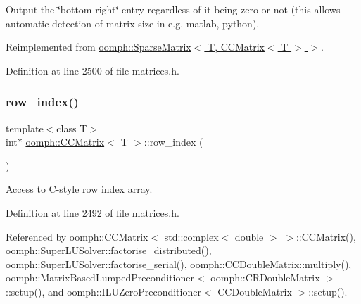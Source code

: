 Output the \char`\"{}bottom right\char`\"{} entry regardless of it being zero or not (this allows automatic detection of matrix size in e.\+g. matlab, python). 



Reimplemented from \hyperlink{classoomph_1_1SparseMatrix_a4c638f36db786e159565e1f890402ed2}{oomph\+::\+Sparse\+Matrix$<$ T, C\+C\+Matrix$<$ T $>$ $>$}.



Definition at line 2500 of file matrices.\+h.

\mbox{\label{classoomph_1_1CCMatrix_acbea54ff48550342267246b7ae07c8c4}} 
\subsubsection{\texorpdfstring{row\+\_\+index()}{row\_index()}\hspace{0.1cm}{\footnotesize\ttfamily [1/2]}}
{\footnotesize\ttfamily template$<$class T$>$ \\
int$\ast$ \hyperlink{classoomph_1_1CCMatrix}{oomph\+::\+C\+C\+Matrix}$<$ T $>$\+::row\+\_\+index (\begin{DoxyParamCaption}{ }\end{DoxyParamCaption})\hspace{0.3cm}{\ttfamily [inline]}}



Access to C-\/style row index array. 



Definition at line 2492 of file matrices.\+h.



Referenced by oomph\+::\+C\+C\+Matrix$<$ std\+::complex$<$ double $>$ $>$\+::\+C\+C\+Matrix(), oomph\+::\+Super\+L\+U\+Solver\+::factorise\+\_\+distributed(), oomph\+::\+Super\+L\+U\+Solver\+::factorise\+\_\+serial(), oomph\+::\+C\+C\+Double\+Matrix\+::multiply(), oomph\+::\+Matrix\+Based\+Lumped\+Preconditioner$<$ oomph\+::\+C\+R\+Double\+Matrix $>$\+::setup(), and oomph\+::\+I\+L\+U\+Zero\+Preconditioner$<$ C\+C\+Double\+Matrix $>$\+::setup().

\mbox{\label{classoomph_1_1CCMatrix_aabe4e5f26a8581821f3c5458aeca7c50}} 
